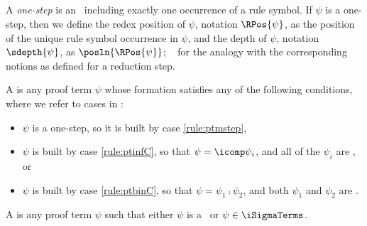 \subsection{\Ppterms}
\label{sec:ppterm}

\begin{definition}
\label{dfn:one-step}
A \emph{one-step} is an \imstep\ including exactly one occurrence of a rule symbol.
If $\psi$ is a one-step, then we define the redex position of $\psi$, notation $\RPos{\psi}$, as the position of the unique rule symbol occurrence in $\psi$, and the depth of $\psi$, notation $\sdepth{\psi}$, as $\posln{\RPos{\psi}}$; \confer\  for the analogy with the corresponding notions as defined for a reduction step.
\end{definition}

\begin{definition}[\Ppterm, \Pnpterm]
\label{dfn:ppterm}
A \emph{\ppterm} is any proof term $\psi$ whose formation satisfies any of the following conditions, where we refer to cases in :
\begin{itemize}
	\item $\psi$ is a one-step, so it is built by case \ref{rule:ptmstep},
	\item $\psi$ is built by case \ref{rule:ptinfC}, so that $\psi = \icomp \psi_i$, and all of the $\psi_i$ are \ppterms, or
	\item $\psi$ is built by case \ref{rule:ptbinC}, so that $\psi = \psi_1 \comp \psi_2$, and both $\psi_1$ and $\psi_2$ are \ppterms.
\end{itemize}
A \emph{\pnpterm} is any proof term $\psi$ such that either $\psi$ is a \ppterm\ or $\psi \in \iSigmaTerms$.
\end{definition}

